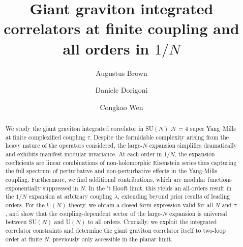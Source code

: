 \documentclass[aps,prl,twocolumn, longbibliography,footinbib,superscriptaddress, preprintnumbers]{revtex4-1}
\newcommand{\<}{\langle}
\renewcommand{\>}{\rangle}
\begin{document}

\title{Giant graviton integrated correlators at finite coupling and all orders in $1/N$}
\author{Augustus Brown}
\author{Daniele Dorigoni}
  \author{Congkao Wen}
\begin{abstract}

We study the giant graviton integrated correlator in SU$(N)$ $\mathcal{N}=4$ super Yang–Mills at finite complexified coupling $\tau$. Despite the formidable complexity arising from the heavy nature of the operators considered, the large-$N$ expansion simplifies dramatically and exhibits manifest modular invariance. At each order in $1/N$, the expansion coefficients are linear combinations of non-holomorphic Eisenstein series thus capturing the full spectrum of perturbative and non-perturbative effects in the Yang-Mills coupling. Furthermore, we find additional contributions, which are modular functions exponentially suppressed in $N$.
In the ’t Hooft limit, this yields an all-orders result in the $1/N$ expansion at arbitrary coupling $\lambda$, extending beyond prior results of leading orders. For the U$(N)$ theory, we obtain a closed-form expression valid for all $N$ and $\tau$, and show that the coupling-dependent sector of the large-$N$ expansion is universal between SU$(N)$ and U$(N)$ to all orders. Crucially, we exploit the integrated correlator constraints and determine the giant graviton correlator itself to two-loop order at finite $N$, previously only accessible in the planar limit.


\end{abstract}


\maketitle
\end{document}
